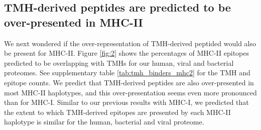 \subsection{TMH-derived peptides are predicted to be over-presented in MHC-II}

We next wondered if the over-representation of TMH-derived peptided would also be present for MHC-II. 
Figure \ref{fig:2} shows the percentages of MHC-II epitopes predicted to be overlapping 
with TMHs for our human, viral and bacterial proteomes.
See supplementary table \ref{tab:tmh_binders_mhc2} 
for the TMH and epitope counts.
We predict that TMH-derived peptides are also over-presented in most MHC-II haplotypes, and this over-presentation seems even more pronounced than for MHC-I. 
Similar to our previous results with MHC-I, we predicted that the extent to which TMH-derived
epitopes are presented by each MHC-II haplotype is similar for the human, bacterial and viral proteome.

